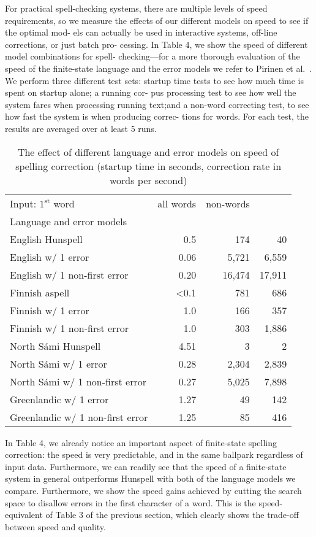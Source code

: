 \documentclass[postprint]{flammie}
\begin{document}
For practical spell-checking systems, there are multiple levels of speed
requirements, so we measure the effects of our different models on speed to see
if the optimal mod- els can actually be used in interactive systems, off-line
corrections, or just batch pro- cessing. In Table 4, we show the speed of
different model combinations for spell- checking—for a more thorough evaluation
of the speed of the finite-state language and the error models we refer to
Pirinen et al.~\cite{pirinen2012effects}. We perform three different test sets:
startup time tests to see how much time is spent on startup alone; a running
cor- pus processing test to see how well the system fares when processing
running text;and a non-word correcting test, to see how fast the system is when
producing correc- tions for words. For each test, the results are averaged over
at least 5 runs.

\begin{table}
    \caption{The effect of different language and error models on speed of spelling correction (startup time in seconds, correction rate in words per second)}
    \begin{tabular}{lrrr}
        Input: $1^{\mathrm{st}}$ word & all words & non-words \\
        Language and error models & & & \\
        English Hunspell & 0.5 & 174 & 40 \\
    English w/ 1 error & 0.06 & 5,721 & 6,559 \\
    English w/ 1 non-first error & 0.20 & 16,474 & 17,911 \\
    Finnish aspell & <0.1 & 781 & 686 \\
    Finnish w/ 1 error & 1.0 & 166 & 357 \\
    Finnish w/ 1 non-first error & 1.0 & 303 & 1,886 \\
    North Sámi Hunspell & 4.51 & 3 & 2 \\
    North Sámi w/ 1 error & 0.28 & 2,304 & 2,839 \\
    North Sámi w/ 1 non-first error & 0.27 & 5,025 & 7,898 \\
    Greenlandic w/ 1 error & 1.27 & 49 & 142 \\
    Greenlandic w/ 1 non-first error & 1.25 & 85 & 416 \\
    \end{tabular}
\end{table}

In Table 4, we already notice an important aspect of finite-state spelling
correction: the speed is very predictable, and in the same ballpark regardless
of input data. Furthermore, we can readily see that the speed of a
finite-state system in general outperforms Hunspell with both of the language
models we compare. Furthermore, we show the speed gains achieved by cutting the
search space to disallow errors in the first character of a word. This is the
speed-equivalent of Table 3 of the previous section, which clearly shows the
trade-off between speed and quality.
\end{document}
